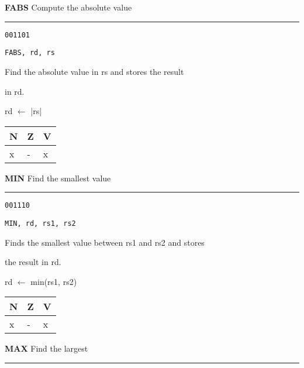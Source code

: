 \documentclass{article}
\begin{document}
\bigskip\bigskip

\flushleft
\LARGE\textbf{FABS} \large \hfill Compute the absolute value

\kern-3pt
\noindent\rule{16.5cm}{0.4pt}
\normalsize

{\large
	 \texttt{001101} \par
	\smallbreak
	 \texttt{FABS, rd, rs} \par
	\smallbreak
	 Find the absolute value in rs and stores the result \par
	\makebox[3.5cm][l]{  } in rd. \par
	\smallbreak
	 rd $\leftarrow$ |rs| \par
	\smallbreak
	 \begin{tabular}{lll} N \quad & Z \quad & V \\ \hline x & - & x \\ \end{tabular}
}

\bigskip\bigskip

\flushleft
\LARGE\textbf{MIN} \large \hfill Find the smallest value

\kern-3pt
\noindent\rule{16.5cm}{0.4pt}
\normalsize

{\large
	 \texttt{001110} \par
	\smallbreak
	 \texttt{MIN, rd, rs1, rs2} \par
	\smallbreak
	 Finds the smallest value between rs1 and rs2 and stores \par
	\makebox[3.5cm][l]{  } the result in rd. \par
	\smallbreak
	 rd $\leftarrow$ min(rs1, rs2) \par
	\smallbreak
	 \begin{tabular}{lll} N \quad & Z \quad & V \\ \hline x & - & x \\ \end{tabular}
}

\pagebreak

\flushleft
\LARGE\textbf{MAX} \large \hfill Find the largest

\kern-3pt
\noindent\rule{16.5cm}{0.4pt}
\normalsize
\end{document}
